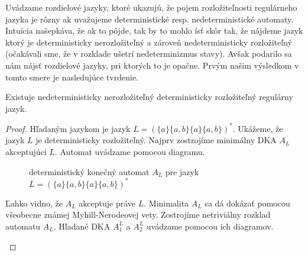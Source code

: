 Uvádzame rozdielové jazyky, ktoré ukazujú, že pojem rozložiteľnosti regulárneho jazyka je rôzny ak uvažujeme deterministické resp. nedeterministické automaty. Intuícia našepkáva, že ak to pôjde, tak by to mohlo ísť skôr tak, že nájdeme jazyk ktorý je deterministicky nerozložiteľný a zároveň nedeterministicky rozložiteľný (očakávali sme, že v rozklade ušetrí nedeterminizmus stavy). Avšak podarilo sa nám nájsť rozdielové jazyky, pri ktorých to je opačne. Prvým našim výsledkom v tomto smere je nasledujúce tvrdenie.

\begin{theorem}
Existuje nedeterministicky nerozložiteľný deterministicky rozložiteľný regulárny jazyk.
\end{theorem}

\begin{proof}
Hľadaným jazykom je jazyk $ L = (\lbrace a \rbrace \lbrace a,b \rbrace \lbrace a \rbrace \lbrace a,b \rbrace)^* $. Ukážeme, že jazyk $ L $ je deterministicky rozložiteľný. Najprv zostrojíme minimálny DKA $ A_{L} $ akceptujúci $ L $. Automat uvádzame pomocou diagramu.

\begin{figure}[H]
\centering
{}
\caption{deterministický konečný automat $ A_{L} $ pre jazyk $ L = (\lbrace a \rbrace \lbrace a,b \rbrace \lbrace a \rbrace \lbrace a,b \rbrace)^* $} \label{fig:DFAa(a|b)a(a|b)^4}
\end{figure}

Ľahko vidno, že $ A_L $ akceptuje práve $ L $. Minimalita $ A_L $ sa dá dokázať pomocou všeobecne známej Myhill-Nerodeovej vety. Zostrojíme netriviálny rozklad automatu $ A_L $. Hľadané DKA $ A_1^L $ a $ A_2^L $ uvádzame pomocou ich diagramov.

\begin{figure}[H]
\centering
{}
\end{figure}
\end{proof}

